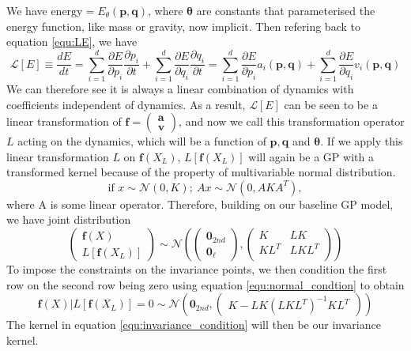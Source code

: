\documentclass{statsmsc}
\begin{document}
We have $\text{energy}=E_\theta(\mathbf{p}, \mathbf{q})$, where $\mathbf{\theta}$ are constants that parameterised the energy function, like mass or gravity, now implicit.
Then refering back to equation \ref{equ:LE}, we have 
\begin{equation}
\mathcal{L}[E] \equiv \frac{dE}{dt}=\sum_{i=1}^d \frac{\partial E}{\partial p_i} \frac{\partial p_i}{\partial t}+ \sum_{i=1}^d\frac{\partial E}{\partial q_i}\frac{\partial q_i}{\partial t} =\sum_{i=1}^d \frac{\partial E}{\partial p_i} a_i(\mathbf{p,q}) + \sum_{i=1}^d\frac{\partial E}{\partial q_i} v_i(\mathbf{p,q})
\label{equ:invariance_equation}
\end{equation}
We can therefore see it is always a linear combination of dynamics with coefficients independent of dynamics.
As a result, $\mathcal{L}[E]$ can be seen to be a linear transformation of $\mathbf{f}=\begin{pmatrix}\mathbf{a}\\\mathbf{v}\end{pmatrix}$, and now we call this transformation operator $L$ acting on the dynamics, which will be a function of $\mathbf{p}, \mathbf{q}$ and $\mathbf{\theta}$.
If we apply this linear transformation $L$ on $\mathbf{f}(X_L)$, $L[\mathbf{f}(X_L)]$ will again be a GP with a transformed kernel because of the property of multivariable normal distribution.
$$
\text{if } x\sim\mathcal{N}(0, K);\ Ax\sim\mathcal{N}(0, AKA^T),
$$
where A is some linear operator.
Therefore, building on our baseline GP model, we have joint distribution
\begin{equation}
\begin{pmatrix}
\mathbf{f}(X)\\L[\mathbf{f}(X_L)]
\end{pmatrix}
\sim\mathcal{N}
\left(\begin{pmatrix}\mathbf{0}_{2nd}\\\mathbf{0}_{\ell}\end{pmatrix}, \begin{pmatrix}
    K & LK \\
    KL^T & LKL^T\\
\end{pmatrix}\right)
\label{equ:invariance_joint}  
\end{equation}
To impose the constraints on the invariance points, we then condition the first row on the second row being zero using equation \ref{equ:normal_condtion} to obtain
\begin{equation}
  \mathbf{f}(X)|L[\mathbf{f}(X_L)]=0 \sim \mathcal{N} \left(\mathbf{0}_{2nd}, \begin{pmatrix}
    K-LK(LKL^T)^{-1}KL^T
  \end{pmatrix}\right)
  \label{equ:invariance_condition}
\end{equation}
The kernel in equation \ref{equ:invariance_condition} will then be our invariance kernel.
\end{document}
